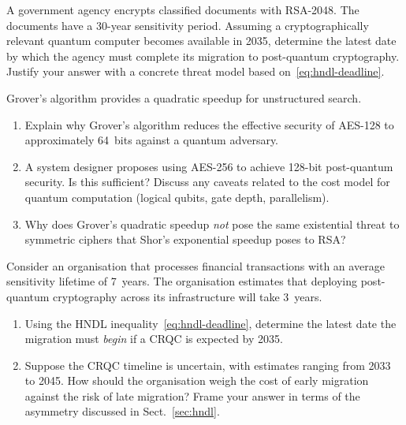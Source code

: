 \begin{prob}
\label{prob:ch01-hndl}
A government agency encrypts classified documents with RSA-2048.  The documents have a 30-year sensitivity period.  Assuming a cryptographically relevant quantum computer becomes available in 2035, determine the latest date by which the agency must complete its migration to post-quantum cryptography.  Justify your answer with a concrete threat model based on~\eqref{eq:hndl-deadline}.
\end{prob}

\begin{prob}
\label{prob:ch01-grover}
Grover's algorithm provides a quadratic speedup for unstructured search.
\begin{enumerate}
\item[(a)] Explain why Grover's algorithm reduces the effective security of AES-128 to approximately 64~bits against a quantum adversary.
\item[(b)] A system designer proposes using AES-256 to achieve 128-bit post-quantum security.  Is this sufficient?  Discuss any caveats related to the cost model for quantum computation (logical qubits, gate depth, parallelism).
\item[(c)] Why does Grover's quadratic speedup \emph{not} pose the same existential threat to symmetric ciphers that Shor's exponential speedup poses to RSA?
\end{enumerate}
\end{prob}

\begin{prob}
\label{prob:ch01-timeline}
Consider an organisation that processes financial transactions with an average sensitivity lifetime of 7~years.  The organisation estimates that deploying post-quantum cryptography across its infrastructure will take 3~years.
\begin{enumerate}
\item[(a)] Using the HNDL inequality~\eqref{eq:hndl-deadline}, determine the latest date the migration must \emph{begin} if a CRQC is expected by 2035.
\item[(b)] Suppose the CRQC timeline is uncertain, with estimates ranging from 2033 to 2045.  How should the organisation weigh the cost of early migration against the risk of late migration?  Frame your answer in terms of the asymmetry discussed in Sect.~\ref{sec:hndl}.
\end{enumerate}
\end{prob}

